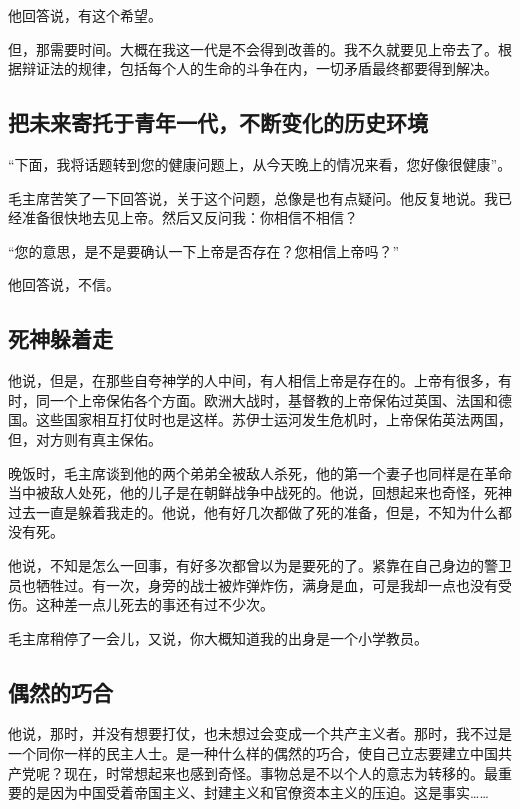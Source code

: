 他回答说，有这个希望。

但，那需要时间。大概在我这一代是不会得到改善的。我不久就要见上帝去了。根据辩证法的规律，包括每个人的生命的斗争在内，一切矛盾最终都要得到解决。

\subsection{把未来寄托于青年一代，不断变化的历史环境}

“下面，我将话题转到您的健康问题上，从今天晚上的情况来看，您好像很健康”。

毛主席苦笑了一下回答说，关于这个问题，总像是也有点疑问。他反复地说。我已经准备很快地去见上帝。然后又反问我：你相信不相信？

“您的意思，是不是要确认一下上帝是否存在？您相信上帝吗？”

他回答说，不信。

\subsection{死神躲着走}

他说，但是，在那些自夸神学的人中间，有人相信上帝是存在的。上帝有很多，有时，同一个上帝保佑各个方面。欧洲大战时，基督教的上帝保佑过英国、法国和德国。这些国家相互打仗时也是这样。苏伊士运河发生危机时，上帝保佑英法两国，但，对方则有真主保佑。

晚饭时，毛主席谈到他的两个弟弟全被敌人杀死，他的第一个妻子也同样是在革命当中被敌人处死，他的儿子是在朝鲜战争中战死的。他说，回想起来也奇怪，死神过去一直是躲着我走的。他说，他有好几次都做了死的准备，但是，不知为什么都没有死。

他说，不知是怎么一回事，有好多次都曾以为是要死的了。紧靠在自己身边的警卫员也牺牲过。有一次，身旁的战士被炸弹炸伤，满身是血，可是我却一点也没有受伤。这种差一点儿死去的事还有过不少次。

毛主席稍停了一会儿，又说，你大概知道我的出身是一个小学教员。

\subsection{偶然的巧合}

他说，那时，并没有想要打仗，也未想过会变成一个共产主义者。那时，我不过是一个同你一样的民主人士。是一种什么样的偶然的巧合，使自己立志要建立中国共产党呢？现在，时常想起来也感到奇怪。事物总是不以个人的意志为转移的。最重要的是因为中国受着帝国主义、封建主义和官僚资本主义的压迫。这是事实……

